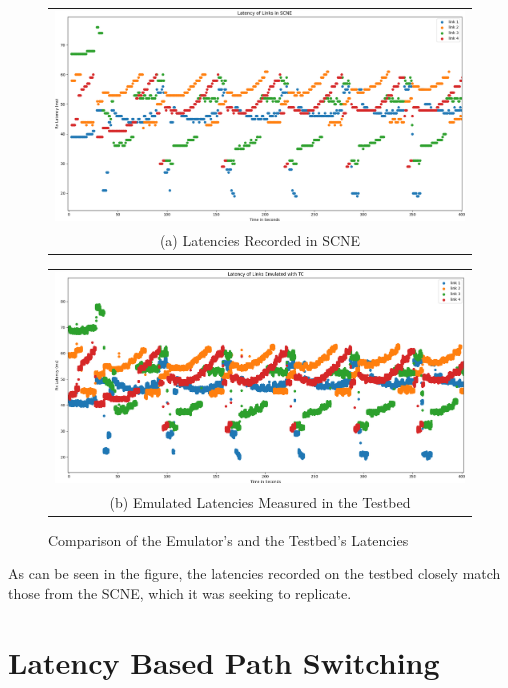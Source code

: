 \begin{figure}
  \centering
  \begin{tabular}{@{}c@{}}
    \includegraphics[width=\linewidth]{fig/simulated_latencies.png} \\[\abovecaptionskip]
    \small (a) Latencies Recorded in SCNE
  \end{tabular}

  \vspace{\floatsep}

  \begin{tabular}{@{}c@{}}
    \includegraphics[width=\linewidth]{fig/emulated_latencies.png} \\[\abovecaptionskip]
    \small (b) Emulated Latencies Measured in the Testbed
  \end{tabular}

  \caption{Comparison of the Emulator's and the Testbed's Latencies}\label{fig:sim_vs_em}
\end{figure}

As can be seen in the figure, the latencies recorded on the testbed closely match those from the SCNE, which it was seeking to replicate.

\section{Latency Based Path Switching}


